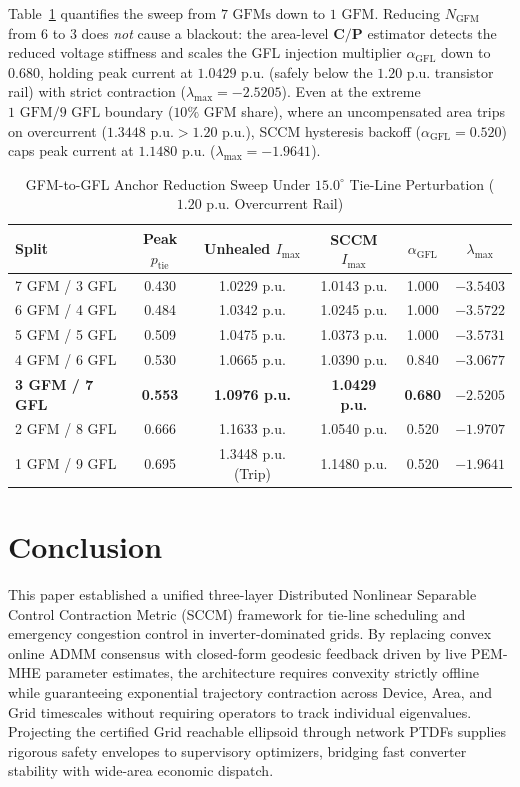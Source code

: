 \documentclass[journal]{IEEEtran}
\begin{document}
Table~\ref{tab:gfm_sweep} quantifies the sweep from $7\text{ GFMs}$ down to $1\text{ GFM}$. Reducing $N_{\text{GFM}}$ from $6$ to $3$ does \emph{not} cause a blackout: the area-level $\mathbf{C}/\mathbf{P}$ estimator detects the reduced voltage stiffness and scales the GFL injection multiplier $\alpha_{\text{GFL}}$ down to $0.680$, holding peak current at $1.0429\text{ p.u.}$ (safely below the $1.20\text{ p.u.}$ transistor rail) with strict contraction ($\lambda_{\max} = -2.5205$). Even at the extreme $1\text{ GFM} / 9\text{ GFL}$ boundary ($10\%$ GFM share), where an uncompensated area trips on overcurrent ($1.3448\text{ p.u.} > 1.20\text{ p.u.}$), SCCM hysteresis backoff ($\alpha_{\text{GFL}} = 0.520$) caps peak current at $1.1480\text{ p.u.}$ ($\lambda_{\max} = -1.9641$).

\begin{table}[!t]
\centering
\caption{GFM-to-GFL Anchor Reduction Sweep Under $15.0^\circ$ Tie-Line Perturbation ($1.20\text{ p.u.}$ Overcurrent Rail)}
\label{tab:gfm_sweep}
\scriptsize
\renewcommand{\arraystretch}{1.15}
\begin{tabular}{@{}lccccc@{}}
\toprule
\textbf{Split} & \textbf{Peak $p_{\text{tie}}$} & \textbf{Unhealed $I_{\max}$} & \textbf{SCCM $I_{\max}$} & $\alpha_{\text{GFL}}$ & $\lambda_{\max}$ \\
\midrule
7 GFM / 3 GFL & 0.430 & 1.0229 p.u. & 1.0143 p.u. & 1.000 & $-3.5403$ \\
6 GFM / 4 GFL & 0.484 & 1.0342 p.u. & 1.0245 p.u. & 1.000 & $-3.5722$ \\
5 GFM / 5 GFL & 0.509 & 1.0475 p.u. & 1.0373 p.u. & 1.000 & $-3.5731$ \\
4 GFM / 6 GFL & 0.530 & 1.0665 p.u. & 1.0390 p.u. & 0.840 & $-3.0677$ \\
\textbf{3 GFM / 7 GFL} & \textbf{0.553} & \textbf{1.0976 p.u.} & \textbf{1.0429 p.u.} & \textbf{0.680} & $\mathbf{-2.5205}$ \\
2 GFM / 8 GFL & 0.666 & 1.1633 p.u. & 1.0540 p.u. & 0.520 & $-1.9707$ \\
1 GFM / 9 GFL & 0.695 & 1.3448 p.u. (Trip) & 1.1480 p.u. & 0.520 & $-1.9641$ \\
\bottomrule
\end{tabular}
\end{table}

\section{Conclusion}
This paper established a unified three-layer Distributed Nonlinear Separable Control Contraction Metric (SCCM) framework for tie-line scheduling and emergency congestion control in inverter-dominated grids. By replacing convex online ADMM consensus with closed-form geodesic feedback driven by live PEM-MHE parameter estimates, the architecture requires convexity strictly offline while guaranteeing exponential trajectory contraction across Device, Area, and Grid timescales without requiring operators to track individual eigenvalues. Projecting the certified Grid reachable ellipsoid through network PTDFs supplies rigorous safety envelopes to supervisory optimizers, bridging fast converter stability with wide-area economic dispatch.
\end{document}
